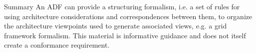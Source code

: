 \documentclass[10pt,letterpaper]{article}
\begin{document}
\begin{CornellSummaryBox}{Summary}
An ADF can provide a structuring formalism, i.e. a set of rules for using architecture considerations and correspondences between them, to organize the architecture viewpoints used to generate associated views, e.g. a grid framework formalism. This material is informative guidance and does not itself create a conformance requirement.
\end{CornellSummaryBox}
\end{document}
